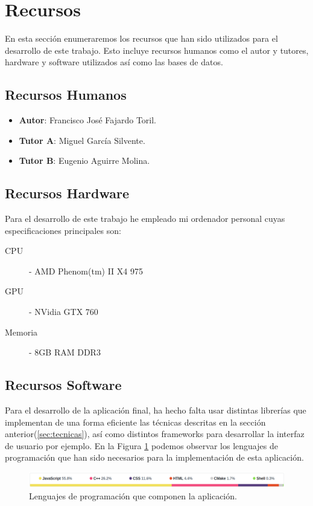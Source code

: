 \documentclass[a4paper,11pt]{book}
\newcommand{\myName}{Francisco José Fajardo Toril\xspace}
\newcommand{\myProf}{Miguel García Silvente\xspace}
\newcommand{\myOtherProf}{Eugenio Aguirre Molina\xspace}
\begin{document}
\section{Recursos}
En esta sección enumeraremos los recursos que han sido utilizados para el desarrollo de este trabajo. Esto incluye recursos humanos como el autor y tutores, hardware y software utilizados así como las bases de datos.
\subsection{Recursos Humanos}
\begin{itemize}
	\item \textbf{Autor}: \myName.
	\item \textbf{Tutor A}: \myProf.
	\item \textbf{Tutor B}: \myOtherProf.
\end{itemize}
\subsection{Recursos Hardware}
Para el desarrollo de este trabajo he empleado mi ordenador personal cuyas especificaciones principales son:
\begin{description}
	\item [CPU] - AMD Phenom(tm) II X4 975
	\item [GPU] - NVidia GTX 760
	\item [Memoria] - 8GB RAM DDR3
\end{description}
\subsection{Recursos Software}\label{sub:software}
Para el desarrollo de la aplicación final, ha hecho falta usar distintas librerías que implementan de una forma eficiente las técnicas descritas en la sección anterior(\ref{sec:tecnicas}), así como distintos frameworks para desarrollar la interfaz de usuario por ejemplo. En la Figura \ref{fig:programming_languages} podemos observar los lenguajes de programación que han sido necesarios para la implementación de esta aplicación.
\\
\begin{figure}[h]
	\centering
	\includegraphics[width=1.0\linewidth]{imagenes/programming_languages}
	\caption[Lenguajes de programación]{Lenguajes de programación que componen la aplicación\cite{franft}.}
	\label{fig:programming_languages}
\end{figure}
\end{document}

